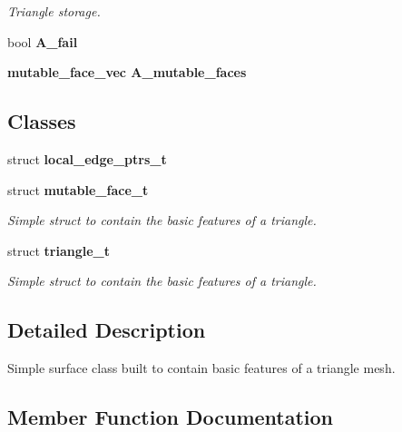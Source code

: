 \begin{CompactItemize}
\begin{CompactList}\small\item\em Triangle storage. \item\end{CompactList}\item 
bool \textbf{A\_\-fail}\label{classSimSite3D_1_1geometry_1_1SimpleTrimeshTwo_dcacbf7733d856f2a2a4d02e36cb6ce0}

\item 
\bf{mutable\_\-face\_\-vec} \textbf{A\_\-mutable\_\-faces}\label{classSimSite3D_1_1geometry_1_1SimpleTrimeshTwo_2b5adc945a54bbd3e91a89c5a56f51c1}

\end{CompactItemize}
\subsection*{Classes}
\begin{CompactItemize}
\item 
struct \textbf{local\_\-edge\_\-ptrs\_\-t}
\item 
struct \bf{mutable\_\-face\_\-t}
\begin{CompactList}\small\item\em Simple struct to contain the basic features of a triangle. \item\end{CompactList}\item 
struct \bf{triangle\_\-t}
\begin{CompactList}\small\item\em Simple struct to contain the basic features of a triangle. \item\end{CompactList}\end{CompactItemize}


\subsection{Detailed Description}
Simple surface class built to contain basic features of a triangle mesh. 



\subsection{Member Function Documentation}
